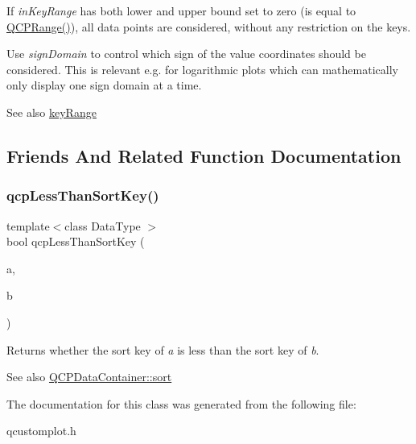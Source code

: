 If {\itshape in\+Key\+Range} has both lower and upper bound set to zero (is equal to {\ttfamily \hyperlink{class_q_c_p_range}{Q\+C\+P\+Range()}}), all data points are considered, without any restriction on the keys.

Use {\itshape sign\+Domain} to control which sign of the value coordinates should be considered. This is relevant e.\+g. for logarithmic plots which can mathematically only display one sign domain at a time.

\begin{DoxySeeAlso}{See also}
\hyperlink{class_q_c_p_data_container_aba6e1a93c21ccc56a432b4a02c9d0ed2}{key\+Range} 
\end{DoxySeeAlso}


\subsection{Friends And Related Function Documentation}
\mbox{\label{class_q_c_p_data_container_a74c5e06728cb6fa778a25d9ec0c4bd36}} 
\subsubsection{\texorpdfstring{qcp\+Less\+Than\+Sort\+Key()}{qcpLessThanSortKey()}}
{\footnotesize\ttfamily template$<$class Data\+Type $>$ \\
bool qcp\+Less\+Than\+Sort\+Key (\begin{DoxyParamCaption}\item[{const Data\+Type \&}]{a,  }\item[{const Data\+Type \&}]{b }\end{DoxyParamCaption})\hspace{0.3cm}{\ttfamily [related]}}

Returns whether the sort key of {\itshape a} is less than the sort key of {\itshape b}.

\begin{DoxySeeAlso}{See also}
\hyperlink{class_q_c_p_data_container_a75da92e33063b63d6da5014683591d45}{Q\+C\+P\+Data\+Container\+::sort} 
\end{DoxySeeAlso}


The documentation for this class was generated from the following file\+:\begin{DoxyCompactItemize}
\item 
qcustomplot.\+h\end{DoxyCompactItemize}
